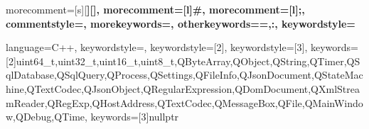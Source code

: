 {
    morecomment=[s][\color{Orchid}\bfseries]{[}{]},
    morecomment=[l]{\#},
    morecomment=[l]{;},
    commentstyle=\color{gray}\ttfamily,
    morekeywords={},
    otherkeywords={=,:},
    keywordstyle={\color{Green}\bfseries}
}

{
    language=C++,
    keywordstyle={\color{blue}\bfseries},
    keywordstyle=[2]{\color{Plum}\bfseries},
    keywordstyle=[3]\color{Orange},
    keywords=[2]{uint64_t,uint32_t,uint16_t,uint8_t,QByteArray,QObject,QString,QTimer,QSqlDatabase,QSqlQuery,QProcess,QSettings,QFileInfo,QJsonDocument,QStateMachine,QTextCodec,QJsonObject,QRegularExpression,QDomDocument,QXmlStreamReader,QRegExp,QHostAddress,QTextCodec,QMessageBox,QFile,QMainWindow,QDebug,QTime},
    keywords=[3]{nullptr}
}



